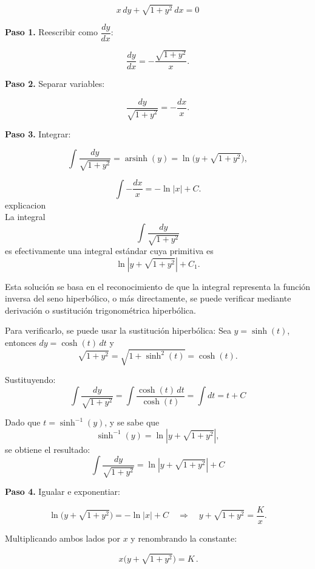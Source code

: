 \documentclass[12pt,a4paper]{article}
\begin{document}
\begin{multicols}{2}
	\[
	x\,dy + \sqrt{1+y^{2}}\,dx = 0
	\]
	
	\textbf{Paso 1.} Reescribir como \(\dfrac{dy}{dx}\):
	
	\[
	\frac{dy}{dx} = -\frac{\sqrt{1+y^{2}}}{x}.
	\]
	
	\textbf{Paso 2.} Separar variables:
	
	\[
	\frac{dy}{\sqrt{1+y^{2}}} = -\frac{dx}{x}.
	\]
	
	\textbf{Paso 3.} Integrar:
	
	\[
	\int \frac{dy}{\sqrt{1+y^{2}}} = \operatorname{arsinh}(y) = \ln\big(y + \sqrt{1+y^2}\big),
	\]
	
	\[
	\int -\frac{dx}{x} = -\ln|x| + C.
	\]
	explicacion\\
	La integral
	\[
	\int \frac{dy}{\sqrt{1+y^2}}
	\]
	es efectivamente una integral estándar cuya primitiva es
	\[
	\ln \left| y + \sqrt{1+y^2} \right| + C_1.
	\]
	
	Esta solución se basa en el reconocimiento de que la integral representa la función inversa del seno hiperbólico, o más directamente, se puede verificar mediante derivación o sustitución trigonométrica hiperbólica.
	
	Para verificarlo, se puede usar la sustitución hiperbólica:  
	Sea \( y = \sinh(t) \), entonces \( dy = \cosh(t)\,dt \) y
	\[
	\sqrt{1+y^2} = \sqrt{1+\sinh^2(t)} = \cosh(t).
	\]
	
	Sustituyendo:
	\[
	\int \frac{dy}{\sqrt{1+y^2}} = \int \frac{\cosh(t)\,dt}{\cosh(t)} = \int dt = t + C
	\]
	
	Dado que \( t = \sinh^{-1}(y) \), y se sabe que
	\[
	\sinh^{-1}(y) = \ln \left| y + \sqrt{1+y^2} \right|,
	\]
	se obtiene el resultado:
	\[
	\int \frac{dy}{\sqrt{1+y^2}} = \ln \left| y + \sqrt{1+y^2} \right| + C
	\]
	
	\textbf{Paso 4.} Igualar e exponentiar:
	
	\[
	\ln\big(y + \sqrt{1+y^2}\big) = -\ln|x| + C
	\quad \Rightarrow \quad
	y+\sqrt{1+y^2} = \frac{K}{x}.
	\]
	
	Multiplicando ambos lados por \(x\) y renombrando la constante:
	
	\[
	\boxed{\,x\bigl(y+\sqrt{1+y^{2}}\bigr)=K\,}.
	\]
	
\end{multicols}
\end{document}

